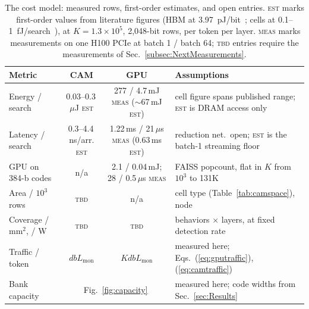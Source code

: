 \begin{table}[t]
\centering
\caption{The cost model: measured rows, first-order estimates, and open
entries. \textsc{est} marks first-order values from literature figures
(HBM at 3.97~pJ/bit~\cite{oconnor2017fgdram}; \cam cells at
0.1--1~fJ/search~\cite{pagiamtzis2006cam,ni2019fetcam,liu2022evacam}),
at $K=1.3\!\times\!10^{5}$, 2{,}048-bit rows, per token per layer.
\textsc{meas} marks measurements on one H100 PCIe at batch 1 / batch
64; \textsc{tbd} entries require the measurements of
Sec.~\ref{subsec:NextMeasurements}.}
\label{tab:costmodel}
{\scriptsize\setlength{\tabcolsep}{3pt}
\begin{tabular}{@{}lccp{}@{}}
\toprule
\textbf{Metric} & \textbf{CAM} & \textbf{GPU} & \textbf{Assumptions} \\
\midrule
Energy / search & \makecell[l]{0.03--0.3\,$\mu$J\\\textsc{est}} &
  \makecell[l]{277 / 4.7\,mJ \textsc{meas}\\($\sim$67\,mJ \textsc{est})} &
  cell figure spans published range; \textsc{est} is DRAM access only \\
Latency / search & \makecell[l]{0.3--4.4\,ns/arr.\\\textsc{est}} &
  \makecell[l]{1.22\,ms / 21\,$\mu$s \textsc{meas}\\(0.63\,ms \textsc{est})} &
  reduction net.\ open; \textsc{est} is the batch-1 streaming floor \\
GPU on 384-b codes & n/a & \makecell[l]{2.1 / 0.04\,mJ; 28 / 0.5\,$\mu$s\\\textsc{meas}} &
  FAISS popcount, flat in $K$ from $10^{3}$ to 131K \\
Area / $10^{3}$ rows & \textsc{tbd} & n/a &
  cell type (Table~\ref{tab:camspace}), node \\
Coverage / mm$^{2}$, / W & \textsc{tbd} & \textsc{tbd} &
  behaviors $\times$ layers, at fixed detection rate \\
Traffic / token & $d b L_{\mathrm{mon}}$ & $K d b L_{\mathrm{mon}}$ &
  measured here; Eqs.~(\ref{eq:gputraffic}), (\ref{eq:camtraffic}) \\
Bank capacity & \multicolumn{2}{c}{Fig.~\ref{fig:capacity}} &
  measured here; code widths from Sec.~\ref{sec:Results} \\
\bottomrule
\end{tabular}}
\end{table}

